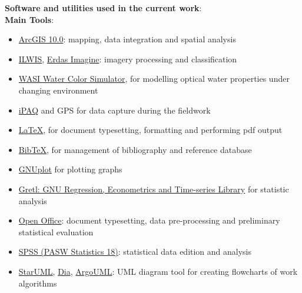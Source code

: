 \documentclass[11pt]{article}
\begin{document}
	\vspace{2em}

	\textbf{Software and utilities used in the current work}:\\
	
	\vspace{1ex}
	\textbf{Main Tools}:
	\begin{itemize}
		\item \href{http://www.esri.com/software/arcgis/index.html}{ArcGIS 10.0}: mapping, data integration and spatial analysis
		\item \href{http://www.ilwis.org/}{ILWIS}, \href{http://www.erdas.com/products/ERDASIMAGINE/ERDASIMAGINE/Details.aspx}{Erdas Imagine}: imagery processing and classification
		\item \href{http://www.filewatcher.com/b/ftp/ftp.dfd.dlr.de/pub/WASI.0.0.html}{WASI Water Color Simulator}, for modelling optical water 					properties under changing environment
		\item \href{http://welcome.hp.com/country/us/en/prodserv/handheld.html}{iPAQ} and \ac{GPS} for data capture during the fieldwork
		\item \href{http://www.latex-project.org/}{\LaTeX}, for document typesetting, formatting and performing pdf output
		\item \href{http://www.bibtex.org/de/}{BibTeX}, for management of bibliography and reference database
		\item \href{http://www.gnuplot.info/}{GNUplot} for plotting graphs
		\item \href{http://gretl.sourceforge.net/}{Gretl: GNU Regression, Econometrics and Time-series Library} for statistic analysis
		\item \href{http://www.openoffice.org/}{Open Office}: document typesetting, data pre-processing and preliminary statistical evaluation		
		\item \href{http://www.spss.com/}{SPSS (PASW Statistics 18)}: statistical data edition and analysis 
		
		\item \href{http://staruml.sourceforge.net/en/}{StarUML}, \href{http://live.gnome.org/Dia}{Dia}, \href{http://argouml.tigris.org/}						{ArgoUML}: \ac{UML} diagram tool for creating flowcharts of work algorithms
	\end{itemize}
	
\end{document}
